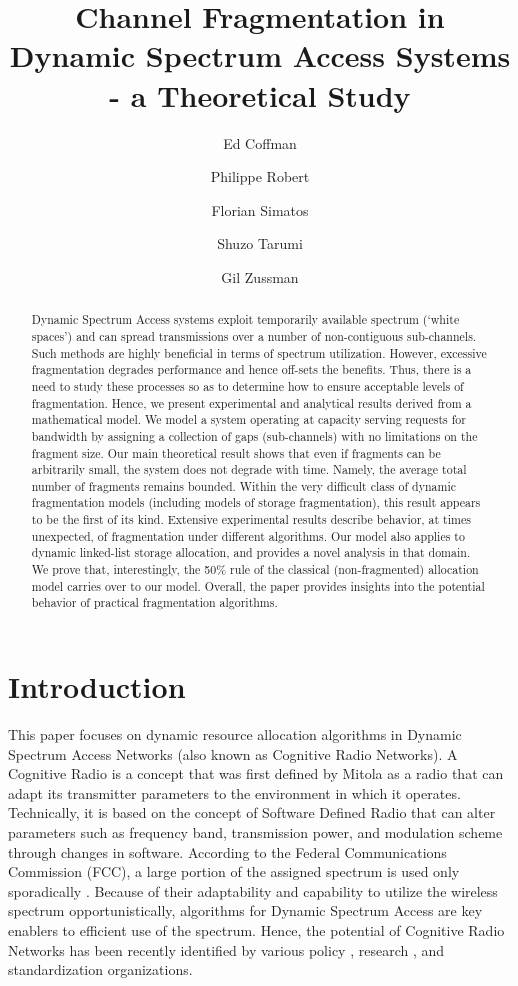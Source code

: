 \documentclass{amsart}
\title[Channel Fragmentation in Dynamic Spectrum Access Systems]{Channel Fragmentation in Dynamic Spectrum Access Systems - a Theoretical Study}
\author[E. Coffman]{Ed Coffman}
\author[Ph. Robert]{Philippe  Robert}
\author[F. Simatos]{Florian Simatos}
\author[S. Tarumi]{Shuzo Tarumi}
\author[G. Zussman]{Gil Zussman}
\begin{document}
\begin{abstract}
Dynamic Spectrum Access systems exploit temporarily available
spectrum (`white spaces') and can spread transmissions over
a number of non-contiguous sub-channels. Such methods are highly beneficial in terms of spectrum utilization.
However, excessive fragmentation degrades performance and hence
off-sets the benefits. Thus, there is a need to study these processes so as to determine how
to ensure acceptable levels of fragmentation. Hence, we present experimental and analytical results derived from
a mathematical model. We model a system operating at
capacity serving requests for bandwidth by assigning a
collection of gaps (sub-channels) with no limitations on the fragment
size. Our main theoretical result shows
that even if fragments can be arbitrarily small, the system does
not degrade with time. Namely, the average total number of fragments
remains bounded.  Within the very difficult class of dynamic
fragmentation models (including models of
storage fragmentation), this result appears to be the first
of its kind. Extensive experimental results describe
behavior, at times unexpected, of fragmentation under different algorithms.
Our model also applies to dynamic linked-list
storage allocation, and provides a novel analysis in that domain. We
prove that, interestingly, the 50\% rule of the classical
(non-fragmented) allocation model carries over to our  model.
Overall, the paper provides insights into the potential
behavior of practical fragmentation algorithms.
\end{abstract}

\maketitle


\section{Introduction}\label{sec:intro}
This paper  focuses on dynamic resource allocation algorithms in Dynamic Spectrum Access  Networks (also known as Cognitive Radio Networks). A Cognitive Radio is a concept that was
first defined by Mitola \cite{Mitola2001,Mitola2000} as a radio that
can adapt its transmitter parameters to the environment in which it
operates. Technically, it is based on the concept of Software Defined Radio
\cite{BoseSI1998} that can alter parameters such as frequency band,
transmission power, and modulation scheme through changes in
software. According to the Federal Communications Commission (FCC), a large
portion  of the assigned spectrum   is
used only sporadically \cite{FCC03222}.  Because  of their adaptability
and capability to utilize the  wireless spectrum opportunistically, algorithms for Dynamic
Spectrum Access are key enablers to efficient use of the  spectrum. Hence, the potential of Cognitive Radio Networks has  been recently identified  by various
policy \cite{FCC0557,FCC08260},  research \cite{DARPAF2003,DARPAV2003}, and
standardization \cite{IEEE80222,IEEE41,ETSI} organizations.
\end{document}
